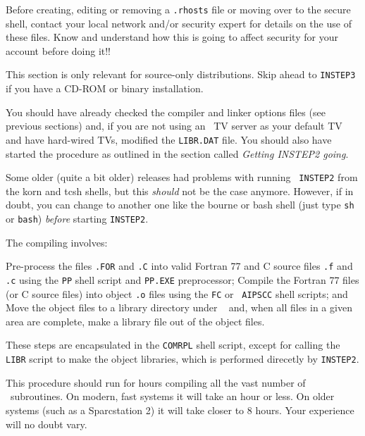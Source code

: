 Before creating, editing or removing a {\tt .rhosts} file or moving over
to the secure shell, contact your local network and/or security expert
for details on the use of these files.  Know and understand how this is
going to affect security for your account before doing it!!

\bigskip

\vfill\eject%

This section is only relevant for source-only distributions.  Skip ahead
to {\tt INSTEP3} if you have a CD-ROM or binary installation.

You should have already checked the compiler and linker options files
(see previous sections) and, if you are not using an \AIPS\ TV server as
your default TV and have hard-wired TVs, modified the {\tt LIBR.DAT}
file.  You should also have started the procedure as outlined in the
section called {\it Getting INSTEP2 going\/}.

Some older (quite a bit older) releases had problems with running {\tt
INSTEP2} from the korn and tcsh shells, but this {\it should\/} not be
the case anymore.  However, if in doubt, you can change to another one
like the bourne or bash shell (just type {\tt sh\ret} or {\tt bash})
{\it before\/} starting {\tt INSTEP2}.

\noindent The compiling involves:\medskip

{\ndot Pre-process the files {\tt *.FOR} and {\tt *.C} into valid
        Fortran 77 and C source files {\tt *.f} and {\tt *.c} using
        the {\tt PP} shell script and {\tt PP.EXE} preprocessor;}
{\ndot Compile the Fortran 77 files (or C source files) into object
        {\tt *.o} files using the {\tt FC} or {\tt
        AIPSCC} shell scripts; and}
{\ndot Move the object files to a library directory under \LIBR~
        and, when all files in a given area are complete, make a
        library file out of the object files.\medskip}

\medskip\noindent These steps are encapsulated in the {\tt COMRPL} shell
script, except for calling the {\tt LIBR} script to make the object
libraries, which is performed direcetly by {\tt INSTEP2}.

\medskip{}

This procedure should run for hours compiling all the vast number of
\aips\ subroutines.  On modern, fast systems it will take an hour or
less.  On older systems (such as a Sparcstation 2) it will take closer
to 8 hours.  Your experience will no doubt vary.

